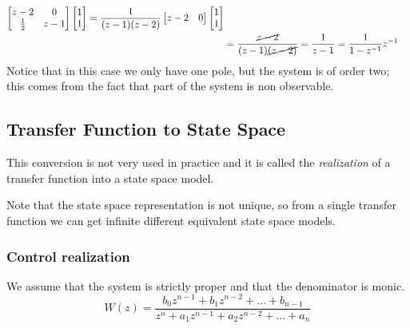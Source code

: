 \begin{exa}
\begin{align*}
\begin{bmatrix}
    z-2 & 0\\
    \frac{1}{2} & z-1\\
\end{bmatrix}
\begin{bmatrix}
    1\\
    1\\
\end{bmatrix}
=
\frac{1}{(z-1)(z-2)}
\begin{bmatrix}
    z-2 & 0\\
\end{bmatrix}
\begin{bmatrix}
    1\\
    1\\
\end{bmatrix}\\
&=
\frac{\cancel{z-2}}{(z-1)\cancel{(z-2)}} = \frac{1}{z-1} = \frac{1}{1-z^{-1}} z^{-1}
\end{align*}
Notice that in this case we only have one pole, but the system is of order two; this comes from the fact that part of the system is non observable.

\end{exa}

\subsection{Transfer Function to State Space}
This conversion is not very used in practice and it is called the \emph{realization} of a transfer function into a state space model.

Note that the state space representation is not unique, so from a single transfer function we can get infinite different equivalent state space models.

\subsubsection{Control realization}

We assume that the system is strictly proper and that the denominator is monic.
\[ W(z) = \frac{b_0 z^{n-1} + b_1 z^{n-2} + \dots + b_{n-1}}{z^n + a_1 z^{n-1} + a_2 z^{n-2} + \dots + a_n} \]

